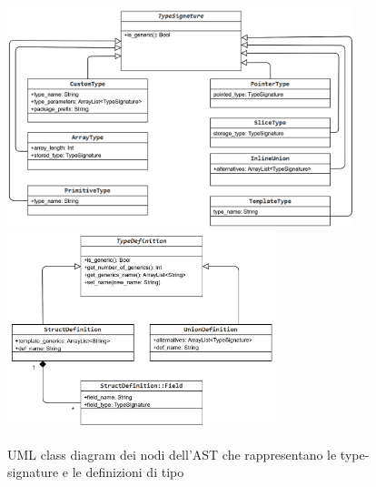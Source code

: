 \begin{figure}[H]
    \centering
        \includegraphics[width=0.9\textwidth]{../../Assets/TypeSignatureAST.png}
        \vspace{0.5cm}
        \includegraphics[width=0.7\textwidth]{../../Assets/TypeDefAST.png}
    \caption{
        \centering
        UML class diagram dei nodi dell'AST che rappresentano le type-signature
        e le definizioni di tipo
    }
\end{figure}